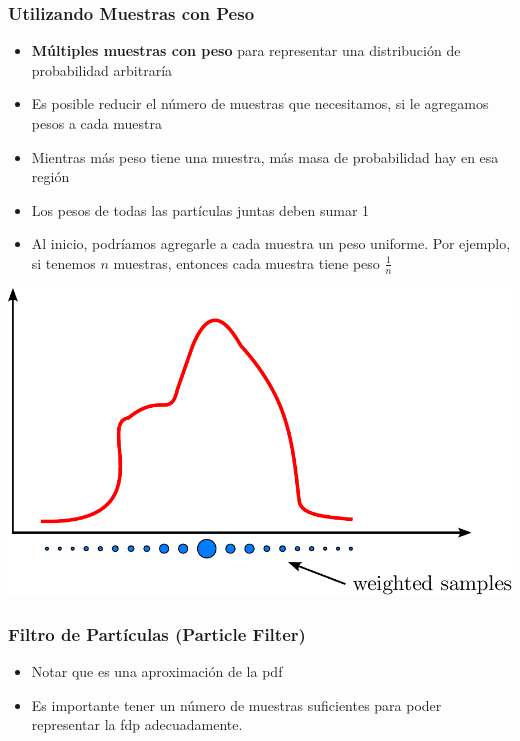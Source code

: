 \begin{frame}
    \frametitle{Utilizando Muestras con Peso}
    \footnotesize
    \begin{itemize}
        \item \textbf{Múltiples muestras con peso} para representar una distribución de probabilidad arbitraría
        \item Es posible reducir el número de muestras que necesitamos, si le agregamos pesos a cada muestra
        \item Mientras más peso tiene una muestra, más masa de probabilidad hay en esa región
        \item Los pesos de todas las partículas juntas deben sumar 1
        \item Al inicio, podríamos agregarle a cada muestra un peso uniforme. Por ejemplo, si tenemos $n$ muestras, entonces cada muestra tiene peso $\frac{1}{n}$
    \end{itemize}
    
    \begin{center}
        \includegraphics[width=0.5\columnwidth]{./images/particle_filter/arbitrary_distribution_weighted_samples.pdf}
    \end{center}
    
\end{frame}

\begin{frame}
    \frametitle{Filtro de Partículas (Particle Filter)}
    
    \footnotesize
    \begin{itemize}
        \item Notar que es una aproximación de la pdf
        \item Es importante tener un número de muestras suficientes para poder representar la fdp adecuadamente.
    \end{itemize}
    
    
\end{frame}


